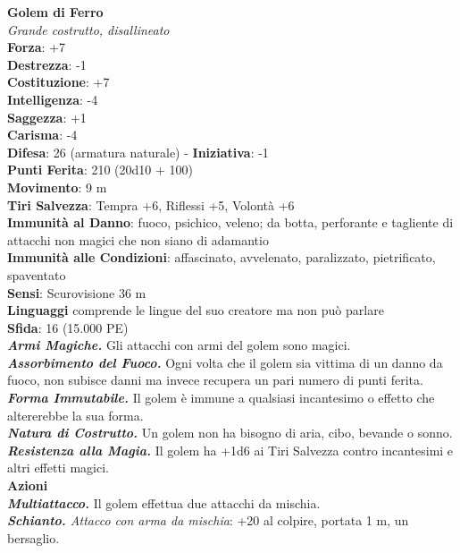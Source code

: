 \begin{multicols}{2}
\medskip\textbf{Golem di Ferro}\\
\emph{Grande costrutto, disallineato}\\
\textbf{Forza}: +7\\
\textbf{Destrezza}: -1\\
\textbf{Costituzione}: +7\\
\textbf{Intelligenza}: -4\\
\textbf{Saggezza}: +1\\
\textbf{Carisma}: -4\\
\textbf{Difesa}: 26 (armatura naturale) - \textbf{Iniziativa}: -1\\
\textbf{Punti Ferita}: 210 (20d10 + 100)\\
\textbf{Movimento}: 9 m\\
\textbf{Tiri Salvezza}: Tempra +6, Riflessi +5, Volontà +6\\
\textbf{Immunità al Danno}: fuoco, psichico, veleno; da botta, perforante e tagliente di attacchi non magici che non siano di adamantio\\
\textbf{Immunità alle Condizioni}: affascinato, avvelenato, paralizzato, pietrificato, spaventato\\
\textbf{Sensi}: Scurovisione 36 m\\
\textbf{Linguaggi} comprende le lingue del suo creatore ma non può parlare\\
\textbf{Sfida}: 16 (15.000 PE)\smallskip\\
\emph{\textbf{Armi Magiche.}} Gli attacchi con armi del golem sono magici.\\
\emph{\textbf{Assorbimento del Fuoco.}} Ogni volta che il golem sia vittima di un danno da fuoco, non subisce danni ma invece recupera un pari numero di punti ferita.\\
\emph{\textbf{Forma Immutabile.}} Il golem è immune a qualsiasi incantesimo o effetto che altererebbe la sua forma.\\
\emph{\textbf{Natura di Costrutto.}} Un golem non ha bisogno di aria, cibo, bevande o sonno.\\
\emph{\textbf{Resistenza alla Magia.}} Il golem ha +1d6 ai Tiri Salvezza contro incantesimi e altri effetti magici.\\
\smallskip\textbf{Azioni}\\
\emph{\textbf{Multiattacco.}} Il golem effettua due attacchi da mischia. \\
\emph{\textbf{Schianto.} Attacco con arma da mischia}: +20 al colpire, portata 1 m, un bersaglio.\\

\end{multicols}
